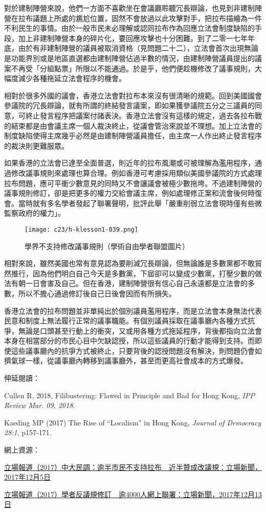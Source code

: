 對於建制陣營來說，他們一方面不喜歡坐在會議廳聆聽冗長辯論，也見到非建制陣營在拉布議題上所處的尷尬位置，固然不會放過以此攻擊對手，把拉布描繪為一件不利民生的事情。由於一般市民未必理解或認同拉布作為回應立法會制度缺陷的手段，加上非建制陣營本身的碎片化，要回應攻擊也十分困難。到了二零一七年年底，由於有非建制陣營的議員被取消資格（見問題二十二），立法會首次出現無論是功能界別或是地區直選都由建制陣營佔過半數的情況，由建制陣營議員提出的議案不再受「分組點票」所限以不能通過。於是乎，他們便趁機修改了議事規則，大幅度減少各種拖延立法會程序的機會。

相對於很多外國的議會，香港立法會對拉布本來沒有很清晰的規範。回到美國國會參議院的冗長辯論，就有所謂的終結發言議案，即如果獲參議院五分之三議員的同意，可終止發言程序把議案付諸表決。香港立法會沒有這樣的規定，過去各拉布戰的結束都是由會議主席一個人裁決終止，從議會管治來說並不理想。加上立法會的制度缺陷使得主席幾乎必然是由建制陣營議員擔任，由主席一人作出終止發言程序的裁決則更難服眾。

如果香港的立法會已達至全面普選，則近年的拉布風潮或可被理解為濫用程序，通過修改議事規則來處理也算合理。例如香港可考慮採用類似美國參議院的方式處理拉布問題，應可平衝少數意見的同時又不會讓議會被極少數拖垮。不過建制陣營的議事規則修訂，卻是把更多的權力交給會議主席，例如處理修正案和流會後何時復會。當時就有多名學者發起了聯署聲明，批評此舉「嚴重削弱立法會現時僅有些微監察政府的權力」。

\begin{figure}[htbp]
    \centering
    \texttt{[image: c23/h-klesson1-039.png]}
    \caption{學界不支持修改議事規則（學術自由學者聯盟圖片）}
\end{figure}

相對來說，雖然美國也常有意見認為要削減冗長辯論，但無論誰是多數黨都不敢貿然推行，因為他們明白自己今天是多數黨，下屆卻可以變成少數黨，打壓少數的做法有朝一日會害及自己。但在香港，建制陣營很有信心自己永遠都是立法會的多數，所以不擔心通過修訂後自己日後會因而有所損失。

香港立法會的拉布問題並非單純出於個別議員濫用程序，而是立法會本身無法代表民意和制度上無法履行正常的議事職能。有個別議員採取在議事廳內各種方式抗爭，無論是口頭甚至行動上的衝突，又或用各種方式拖延程序，背後都指向立法會本身在相當部分的市民心目中欠缺認授，所以這些議員的行動才能得到支持。而即使這些議事廳內的抗爭方式被終止，只要背後的認授問題沒有解決，則問題仍會如擠氣球一樣，從議事廳內轉移到議事廳外，甚至而更高社會成本的方式爆發。



伸延閱讀：

Cullen R, 2018, Filibustering: Flawed in Principle and Bad for Hong Kong, \textit{IPP Review Mar. 09, 2018}.

Kaeding MP (2017) The Rise of “Localism” in Hong Kong, \textit{Journal of Democracy 28:1}, p157-171.


網上資源：

\href{https://thestandnews.com/politics/中大民調-逾半市民不支持拉布/}{立場報道（2017）中大民調：逾半市民不支持拉布　近半贊成改議規：立場新聞，2017年12月5日}

\href{https://thestandnews.com/politics/學者反議規修訂-逾4000人網上聯署/}{立場報道（2017）學者反議規修訂　逾4000人網上聯署：立場新聞，2017年12月13日}